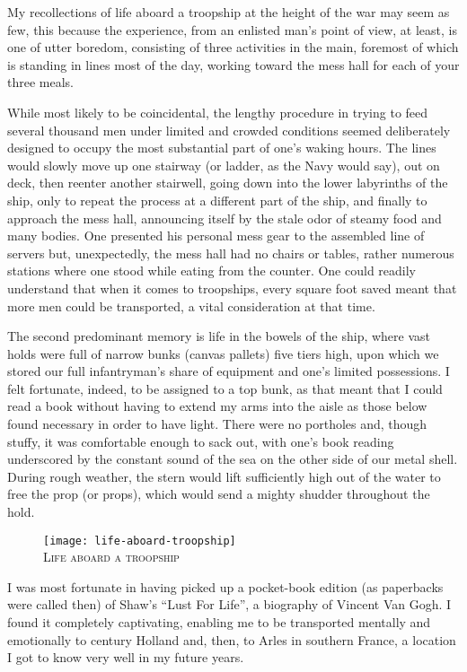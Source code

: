 \documentclass[../m3y]{subfiles}
\begin{document}
My recollections of life aboard a troopship at the height of the war may seem as few, this because the experience, from an enlisted man's point of view, at least, is one of utter boredom, consisting of three activities in the main, foremost of which is standing in lines most of the day, working toward the mess hall for each of your three meals.

While most likely to be coincidental, the lengthy procedure in trying to feed several thousand men under limited and crowded conditions seemed deliberately designed to occupy the most substantial part of one's waking hours. The lines would slowly move up one stairway (or ladder, as the Navy would say), out on deck, then reenter another stairwell, going down into the lower labyrinths of the ship, only to repeat the process at a different part of the ship, and finally to approach the mess hall, announcing itself by the stale odor of steamy food and many bodies. One presented his personal mess gear to the assembled line of servers but, unexpectedly, the mess hall had no chairs or tables, rather numerous stations where one stood while eating from the counter. One could readily understand that when it comes to troopships, every square foot saved meant that more men could be transported, a vital consideration at that time.

The second predominant memory is life in the bowels of the ship, where vast holds were full of narrow bunks (canvas pallets) five tiers high, upon which we stored our full infantryman's share of equipment and one's limited possessions. I felt fortunate, indeed, to be assigned to a top bunk, as that meant that I could read a book without having to extend my arms into the aisle as those below found necessary in order to have light. There were no portholes and, though stuffy, it was comfortable enough to sack out, with one's book reading underscored by the constant sound of the sea on the other side of our metal shell. During rough weather, the stern would lift sufficiently high out of the water to free the prop (or props), which would send a mighty shudder throughout the hold.

\begin{figure}
\centering
\texttt{[image: life-aboard-troopship]}\\
\medskip
{\newtimes\textsc{Life aboard a troopship}}
\end{figure}

I was most fortunate in having picked up a pocket-book edition (as paperbacks were called then) of Shaw's ``Lust For Life'', a biography of Vincent Van Gogh. I found it completely captivating, enabling me to be transported mentally and emotionally to  century Holland and, then, to Arles in southern France, a location I got to know very well in my future years.
\end{document}
